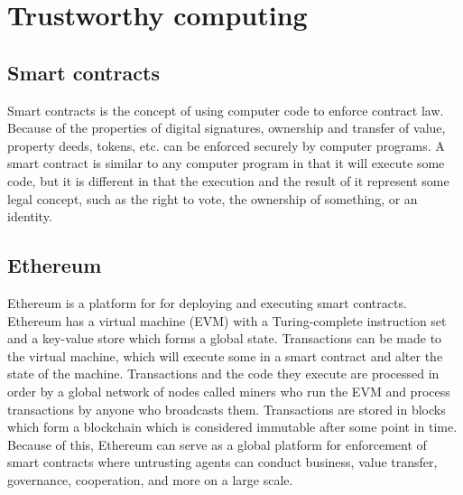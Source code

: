 \section{Trustworthy computing}
\label{sec:trustworthy}

\subsection{Smart contracts}

Smart contracts is the concept of using computer code to enforce contract law. Because of the properties of digital signatures, ownership and transfer of value, property deeds, tokens, etc. can be enforced securely by computer programs. A smart contract is similar to any computer program in that it will execute some code, but it is different in that the execution and the result of it represent some legal concept, such as the right to vote, the ownership of something, or an identity. 

\subsection{Ethereum}

Ethereum \cite{wood2018ethereum} is a platform for for deploying and executing smart contracts. Ethereum has a virtual machine (EVM) with a Turing-complete instruction set and a key-value store which forms a global state. Transactions can be made to the virtual machine, which will execute some in a smart contract and alter the state of the machine. Transactions and the code they execute are processed in order by a global network of nodes called miners who run the EVM and process transactions by anyone who broadcasts them. Transactions are stored in blocks which form a blockchain which is considered immutable after some point in time. Because of this, Ethereum can serve as a global platform for enforcement of smart contracts where untrusting agents can conduct business, value transfer, governance, cooperation, and more on a large scale.

